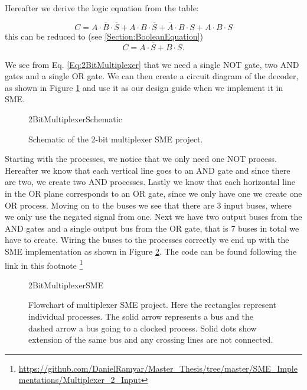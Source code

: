         Hereafter we derive the logic equation from the table:
        
        \begin{equation}
        C = A \cdot \overline{B} \cdot \overline{S} + A \cdot B \cdot \overline{S} + \overline{A} \cdot B \cdot S + A \cdot B \cdot S
        \end{equation}
        this can be reduced to (see \ref{Section:BooleanEquation})
        \begin{equation}
        \label{Eq:2BitMultiplexer}
        C = A\cdot \bar{S} + B\cdot S.
        \end{equation}
        
        We see from Eq. \ref{Eq:2BitMultiplexer} that we need a single NOT gate, two AND gates and a single OR gate. We can then create a circuit diagram of the decoder, as shown in Figure \ref{fig:2BitMultiplexerSchematic} and use it as our design guide when we implement it in SME.
        \begin{figure}[h!]
            \centering
            {2BitMultiplexerSchematic}
            \caption{Schematic of the 2-bit multiplexer SME project.}
            \label{fig:2BitMultiplexerSchematic}
        \end{figure}
    
        Starting with the processes, we notice that we only need one NOT process. Hereafter we know that each vertical line goes to an AND gate and since there are two, we create two AND processes. Lastly we know that each horizontal line in the OR plane corresponds to an OR gate, since we only have one we create one OR process.
        Moving on to the buses we see that there are 3 input buses, where we only use the negated signal from one. Next we have two output buses from the AND gates and a single output bus from the OR gate, that is 7 buses in total we have to create. Wiring the buses to the processes correctly we end up with the SME implementation as shown in Figure \ref{fig:2BitMultiplexerSME}. The code can be found following the link in this footnote \footnote{\url{https://github.com/DanielRamyar/Master_Thesis/tree/master/SME_Implementations/Multiplexer_2_Input}}  
    
        \begin{figure}[h!]
            \centering
            {2BitMultiplexerSME}
            \caption{Flowchart of multiplexer SME project. Here the rectangles represent individual processes. The solid arrow represents a bus and the dashed arrow a bus going to a clocked process. Solid dots show extension of the same bus and any crossing lines are not connected.}
            \label{fig:2BitMultiplexerSME}
        \end{figure}
    

